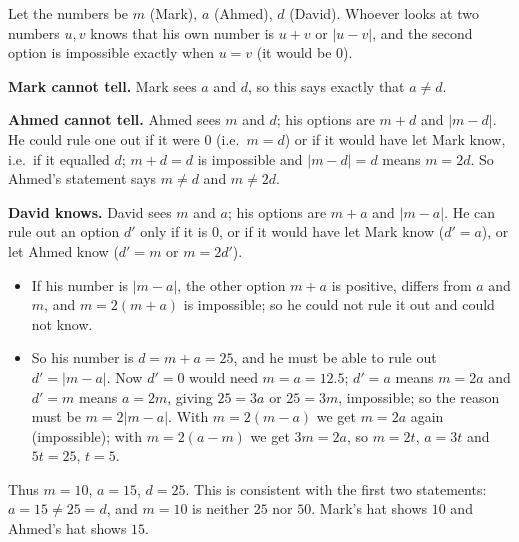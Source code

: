 Let the numbers be $m$ (Mark), $a$ (Ahmed), $d$ (David). Whoever looks at two numbers $u,v$ knows that his own number is $u+v$ or $|u-v|$, and the second option is impossible exactly when $u=v$ (it would be $0$).

\textbf{Mark cannot tell.} Mark sees $a$ and $d$, so this says exactly that $a\ne d$.

\textbf{Ahmed cannot tell.} Ahmed sees $m$ and $d$; his options are $m+d$ and $|m-d|$. He could rule one out if it were $0$ (i.e.\ $m=d$) or if it would have let Mark know, i.e.\ if it equalled $d$; $m+d=d$ is impossible and $|m-d|=d$ means $m=2d$. So Ahmed's statement says $m\ne d$ and $m\ne2d$.

\textbf{David knows.} David sees $m$ and $a$; his options are $m+a$ and $|m-a|$. He can rule out an option $d'$ only if it is $0$, or if it would have let Mark know ($d'=a$), or let Ahmed know ($d'=m$ or $m=2d'$).
\begin{itemize}
\item If his number is $|m-a|$, the other option $m+a$ is positive, differs from $a$ and $m$, and $m=2(m+a)$ is impossible; so he could not rule it out and could not know.
\item So his number is $d=m+a=25$, and he must be able to rule out $d'=|m-a|$. Now $d'=0$ would need $m=a=12.5$; $d'=a$ means $m=2a$ and $d'=m$ means $a=2m$, giving $25=3a$ or $25=3m$, impossible; so the reason must be $m=2|m-a|$. With $m=2(m-a)$ we get $m=2a$ again (impossible); with $m=2(a-m)$ we get $3m=2a$, so $m=2t$, $a=3t$ and $5t=25$, $t=5$.
\end{itemize}
Thus $m=10$, $a=15$, $d=25$. This is consistent with the first two statements: $a=15\ne25=d$, and $m=10$ is neither $25$ nor $50$. Mark's hat shows $\boxed{10}$ and Ahmed's hat shows $\boxed{15}$.
